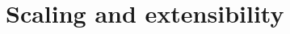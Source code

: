 \documentclass{report}
\begin{document}
\chapter{Scaling and extensibility}
\label{cha:scaling-and-extensibility}
\end{document}
